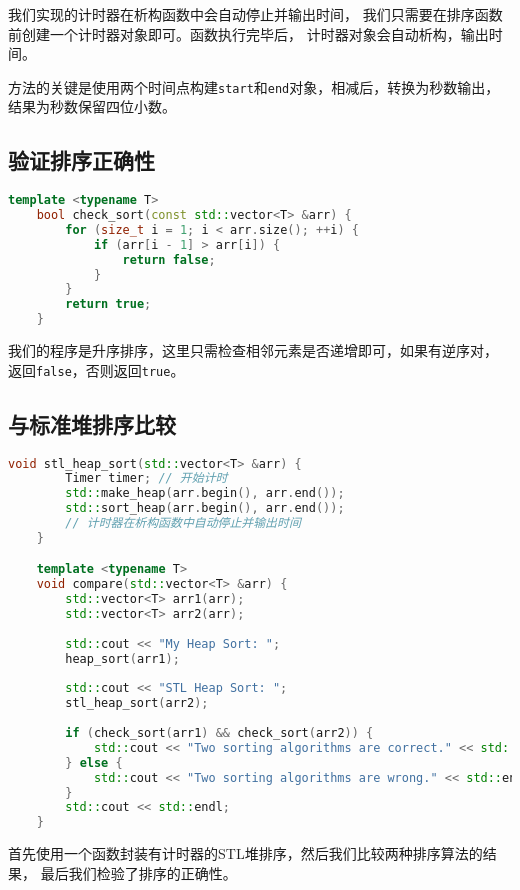 \documentclass[UTF8]{ctexart}
\begin{document}
我们实现的计时器在析构函数中会自动停止并输出时间，
我们只需要在排序函数前创建一个计时器对象即可。函数执行完毕后，
计时器对象会自动析构，输出时间。

方法的关键是使用两个时间点构建\texttt{start}和\texttt{end}对象，相减后，转换为秒数输出，
结果为秒数保留四位小数。

\subsection{验证排序正确性}

\begin{lstlisting}[language=C++]
    template <typename T>
    bool check_sort(const std::vector<T> &arr) {
        for (size_t i = 1; i < arr.size(); ++i) {
            if (arr[i - 1] > arr[i]) {
                return false;
            }
        }
        return true;
    }
\end{lstlisting}

我们的程序是升序排序，这里只需检查相邻元素是否递增即可，如果有逆序对，
返回\texttt{false}，否则返回\texttt{true}。

\subsection{与标准堆排序比较}

\begin{lstlisting}[language=C++]
    void stl_heap_sort(std::vector<T> &arr) {
        Timer timer; // 开始计时
        std::make_heap(arr.begin(), arr.end());
        std::sort_heap(arr.begin(), arr.end());
        // 计时器在析构函数中自动停止并输出时间
    }

    template <typename T>
    void compare(std::vector<T> &arr) {
        std::vector<T> arr1(arr);
        std::vector<T> arr2(arr);
    
        std::cout << "My Heap Sort: ";
        heap_sort(arr1);
    
        std::cout << "STL Heap Sort: ";
        stl_heap_sort(arr2);
    
        if (check_sort(arr1) && check_sort(arr2)) {
            std::cout << "Two sorting algorithms are correct." << std::endl;
        } else {
            std::cout << "Two sorting algorithms are wrong." << std::endl;
        }
        std::cout << std::endl;
    }
\end{lstlisting}

首先使用一个函数封装有计时器的STL堆排序，然后我们比较两种排序算法的结果，
最后我们检验了排序的正确性。
\end{document}
